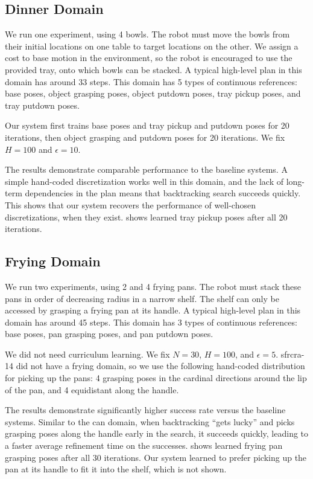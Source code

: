 \subsection{Dinner Domain}
We run one experiment, using 4 bowls. The robot must
move the bowls from their initial locations on one table to target
locations on the other. We assign a cost to base motion in the
environment, so the robot is encouraged to use the provided tray, onto
which bowls can be stacked. A typical high-level plan in this domain has around 33 steps.
This domain has 5 types of continuous
references: base poses, object grasping poses, object putdown poses,
tray pickup poses, and tray putdown poses.

Our system first trains base poses and tray pickup
and putdown poses for 20 iterations, then object grasping and putdown
poses for 20 iterations. We fix $H = 100$ and $\epsilon = 10$.

The results demonstrate comparable performance to the baseline
systems. A simple hand-coded discretization works well in
this domain, and the lack of long-term
dependencies in the plan means that backtracking search succeeds
quickly. This shows that our system recovers the performance of
well-chosen discretizations, when they exist.  shows learned tray
pickup poses after all 20 iterations.

\subsection{Frying Domain}
We run two experiments, using 2 and 4 frying pans. The robot
must stack these pans in order of decreasing radius in a narrow
shelf. The shelf can only be accessed by grasping a frying pan at its handle.
A typical high-level plan in this domain has around 45 steps.
This domain has 3 types of continuous references: base poses,
pan grasping poses, and pan putdown poses.

We did not need curriculum learning. We fix $N = 30$, $H = 100$, and
$\epsilon = 5$. {\sc sfrcra-14} did not have a frying domain, so we
use the following hand-coded distribution for picking up the pans: 4
grasping poses in the cardinal directions around the lip of the pan,
and 4 equidistant along the handle.

The results demonstrate significantly higher success rate versus the
baseline systems. Similar to the can domain, when backtracking ``gets lucky'' and
picks grasping poses along the handle early in the search, it succeeds quickly, leading
to a faster average refinement time on the successes.
 shows learned frying pan grasping poses
after all 30 iterations. Our system learned to prefer picking up the
pan at its handle to fit it into the shelf, which is not shown.






